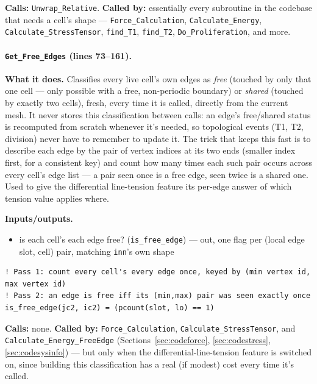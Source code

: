 \documentclass[11pt]{article}
\begin{document}
\textbf{Calls:} \texttt{Unwrap\_Relative}. \textbf{Called by:} essentially every
subroutine in the codebase that needs a cell's shape --- \texttt{Force\_Calculation},
\texttt{Calculate\_Energy}, \texttt{Calculate\_StressTensor}, \texttt{find\_T1},
\texttt{find\_T2}, \texttt{Do\_Proliferation}, and more.

\paragraph{\texttt{Get\_Free\_Edges} (lines 73--161).}
\textbf{What it does.} Classifies every live cell's own edges as \emph{free} (touched
by only that one cell --- only possible with a free, non-periodic boundary) or
\emph{shared} (touched by exactly two cells), fresh, every time it is called, directly
from the current mesh. It never stores this classification between calls: an edge's
free/shared status is recomputed from scratch whenever it's needed, so topological
events (T1, T2, division) never have to remember to update it. The trick that keeps
this fast is to describe each edge by the pair of vertex indices at its two ends
(smaller index first, for a consistent key) and count how many times each such pair
occurs across every cell's edge list --- a pair seen once is a free edge, seen twice is
a shared one. Used to give the differential line-tension feature
its per-edge answer of which tension value applies where.

\textbf{Inputs/outputs.}
\begin{itemize}[nosep]
  \item is each cell's each edge free? (\texttt{is\_free\_edge}) --- out, one flag per (local edge slot, cell) pair, matching \texttt{inn}'s own shape
\end{itemize}

\begin{lstlisting}[caption={The two-pass edge-counting scheme behind \texttt{Get\_Free\_Edges}.}]
! Pass 1: count every cell's every edge once, keyed by (min vertex id, max vertex id)
! Pass 2: an edge is free iff its (min,max) pair was seen exactly once
is_free_edge(jc2, ic2) = (pcount(slot, lo) == 1)
\end{lstlisting}

\textbf{Calls:} none. \textbf{Called by:} \texttt{Force\_Calculation},
\texttt{Calculate\_StressTensor}, and \texttt{Calculate\_Energy\_FreeEdge}
(Sections~\ref{sec:codeforce}, \ref{sec:codestress}, \ref{sec:codesysinfo}) --- but only
when the differential-line-tension feature is switched on, since building this
classification has a real (if modest) cost every time it's called.
\end{document}

